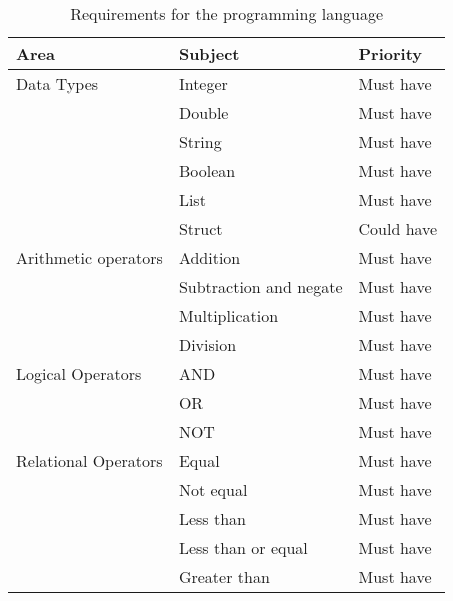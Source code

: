 \begin{table}[H]
\begin{tabular}{@{}lll@{}}
\toprule
\caption{Requirements for the programming language}
\textbf{Area}          & \textbf{Subject}        & \textbf{Priority}               \\ \midrule
Data Types             & Integer                 & Must have                       \\
                       & Double                  & Must have                       \\
                       & String                  & Must have                       \\
                       & Boolean                 & Must have                       \\ 
                       & List                    & Must have                     \\
                       & Struct                  & Could have                      \\\midrule
Arithmetic operators   & Addition                & Must have                       \\
                       & Subtraction and negate  & Must have                       \\
                       & Multiplication          & Must have                       \\
                       & Division                & Must have                       \\ \midrule
Logical Operators      & AND                     & Must have                     \\
                       & OR                      & Must have                     \\ 
                       & NOT                     & Must have                     \\\midrule
Relational Operators   & Equal                   & Must have                       \\
                       & Not equal               & Must have                       \\
                       & Less than               & Must have                       \\
                       & Less than or equal      & Must have                       \\
                       & Greater than            & Must have                       \\

\end{tabular}
\end{table}
